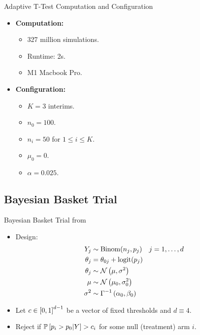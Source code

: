 \begin{frame}{Adaptive T-Test Computation and Configuration}
\begin{itemize}
    \item \textbf{Computation:}
    \begin{itemize}
        \item 327 million simulations.
        \item Runtime: 2s.
        \item M1 Macbook Pro.
    \end{itemize}
    \item \textbf{Configuration:}
    \begin{itemize}
        \item $K=3$ interims.
        \item $n_0 = 100$.
        \item $n_i = 50$ for $1 \leq i \leq K$.
        \item $\mu_0 = 0$.
        \item $\alpha = 0.025$.
    \end{itemize}
\end{itemize}
\end{frame}

\subsection{Bayesian Basket Trial}

\begin{frame}{Bayesian Basket Trial from~\citet{berry:2013}}
\begin{itemize}
    \item Design:
        \begin{align*}
            Y_j &\sim \operatorname{Binom}(n_j, p_j) \quad j=1,\ldots, d \\
            \theta_j &= \theta_{0j} + \operatorname{logit}(p_j) \\
            \theta_j &\sim \mathcal{N}\left( \mu, \sigma^2 \right) \\
            \mu &\sim \mathcal{N}\left( \mu_0, \sigma_0^2 \right) \\
            \sigma^2 &\sim \Gamma^{-1}\left( \alpha_0, \beta_0 \right)
        \end{align*}
    \item Let $c \in \left[0,1\right]^{d-1}$ be a vector of fixed thresholds and $d \equiv 4$.
    \item Reject if $\mathbb{P}\left[p_i > p_0 | Y\right] > c_i$ for some null (treatment) arm $i$.
\end{itemize}
\end{frame}

